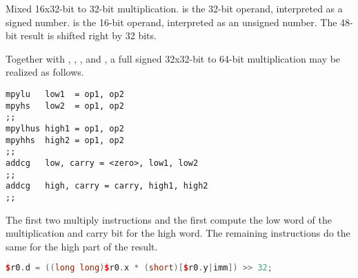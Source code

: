 \noindent Mixed 16x32-bit to 32-bit multiplication.  is the 32-bit operand,
interpreted as a signed number. \code{[$r0.y|imm]} is the 16-bit operand, interpreted as
an unsigned number. The 48-bit result is shifted right by 32 bits.

Together with , , ,  and
, a full signed 32x32-bit to 64-bit multiplication may be realized
as follows.

\begin{lstlisting}[numbers=none, basicstyle=\ttfamily\footnotesize, language=vexasm]
mpylu   low1  = op1, op2
mpyhs   low2  = op1, op2
;;
mpylhus high1 = op1, op2
mpyhhs  high2 = op1, op2
;;
addcg   low, carry = <zero>, low1, low2
;;
addcg   high, carry = carry, high1, high2
;;
\end{lstlisting}

\noindent The first two multiply instructions and the first  compute
the low word of the multiplication and carry bit for the high word. The
remaining instructions do the same for the high part of the result.

\begin{lstlisting}[numbers=none, basicstyle=\ttfamily\footnotesize, language=C++]
$r0.d = ((long long)$r0.x * (short)[$r0.y|imm]) >> 32;
\end{lstlisting}


